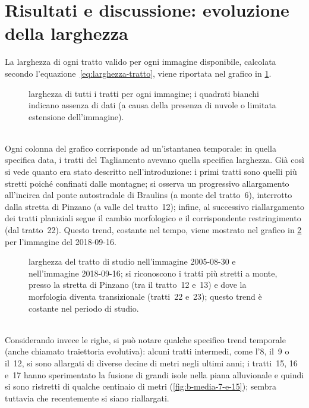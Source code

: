 \section{Risultati e discussione: evoluzione della larghezza}
La larghezza di ogni tratto valido per ogni immagine disponibile, calcolata secondo l'equazione~\eqref{eq:larghezza-tratto}, viene riportata nel grafico in \cref{graph:larghezze-tutti-tratti}.
%
\begin{figure}
	\centering
	
	\caption[larghezza di tutti i tratti per ogni immagine]{larghezza di tutti i tratti per ogni immagine; i quadrati bianchi indicano assenza di dati (a causa della presenza di nuvole o limitata estensione dell'immagine).}
	\label{graph:larghezze-tutti-tratti}
\end{figure}
%
\\
Ogni colonna del grafico corrisponde ad un'istantanea temporale: in quella specifica data, i tratti del Tagliamento avevano quella specifica larghezza.
Già così si vede quanto era stato descritto nell'introduzione:
i primi tratti sono quelli più stretti poiché confinati dalle montagne;
si osserva un progressivo allargamento all'incirca dal ponte autostradale di Braulins (a monte del tratto~6), interrotto dalla stretta di Pinzano (a valle del tratto~12);
infine, al successivo riallargamento dei tratti planiziali segue il cambio morfologico e il corrispondente restringimento (dal tratto~22).
Questo trend, costante nel tempo, viene mostrato nel grafico in \cref{graph:larghezza-2005-2018-09} per l'immagine \Se{} del 2018-09-16.
%
\begin{figure}
	\centering
	
	\caption[larghezza del tratto di studio nel 2005-08-30 e nel 2018-09-16]{larghezza del tratto di studio nell'immagine \AST{} 2005-08-30 e nell'immagine \Se{} 2018-09-16; si riconoscono i tratti più stretti a monte, presso la stretta di Pinzano (tra il tratto~12 e~13) e dove la morfologia diventa transizionale (tratti~22 e~23); questo trend è costante nel periodo di studio.}
	\label{graph:larghezza-2005-2018-09}
\end{figure}
%
\\
Considerando invece le righe, si può notare qualche specifico trend temporale (anche chiamato traiettoria evolutiva):
alcuni tratti intermedi, come l'8, il~9 o il~12, si sono allargati di diverse decine di metri negli ultimi anni;
i tratti~15, 16 e~17 hanno sperimentato la fusione di grandi isole nella piana alluvionale e quindi si sono ristretti di qualche centinaio di metri (\cref{fig:b-media-7-e-15}); sembra tuttavia che recentemente si siano riallargati.
